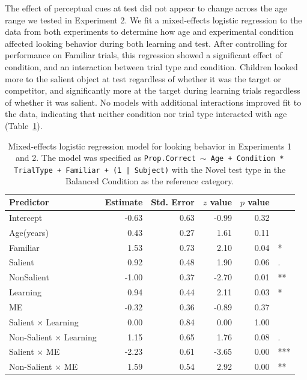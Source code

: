 \documentclass[man,floatsintext]{apa6}
\begin{document}
The effect of perceptual cues at test did not appear to change across the age range we tested in Experiment 2. We fit a mixed-effects logistic regression to the data from both experiments to determine how age and experimental condition affected looking behavior during both learning and test. After controlling for performance on Familiar trials, this regression showed a significant effect of condition, and an interaction between trial type and condition. Children looked more to the salient object at test regardless of whether it was the target or competitor, and significantly more at the target during learning trials regardless of whether it was salient. No models with additional interactions improved fit to the data, indicating that neither condition nor trial type interacted with age (Table~\ref{tab:model_table}). 

\begin{table}[tb]
\centering
\begin{tabular}{lrrrrl}
 Predictor & Estimate & Std. Error & $z$ value & $p$ value &  \\ 
  \hline
Intercept & -0.63 & 0.63 & -0.99 & 0.32 &  \\ 
  Age(years) & 0.43 & 0.27 & 1.61 & 0.11 &  \\ 
  Familiar & 1.53 & 0.73 & 2.10 & 0.04 & * \\ 
  Salient & 0.92 & 0.48 & 1.90 & 0.06 & . \\ 
  NonSalient & -1.00 & 0.37 & -2.70 & 0.01 & ** \\ 
  Learning & 0.94 & 0.44 & 2.11 & 0.03 & * \\ 
  ME & -0.32 & 0.36 & -0.89 & 0.37 &  \\ 
  Salient $\times$ Learning & 0.00 & 0.84 & 0.00 & 1.00 &  \\ 
  Non-Salient $\times$ Learning & 1.15 & 0.65 & 1.76 & 0.08 & . \\ 
  Salient $\times$ ME & -2.23 & 0.61 & -3.65 & 0.00 & *** \\ 
  Non-Salient $\times$ ME & 1.59 & 0.54 & 2.92 & 0.00 & ** \\ 
   \hline
\end{tabular}
\vspace{6pt}
\caption{\label{tab:model_table} Mixed-effects logistic regression model for looking behavior in Experiments 1 and 2. The model was specified as \small{\tt{Prop.Correct $\sim$ Age + Condition * TrialType + Familiar + (1 | Subject)}} with the Novel test type in the Balanced Condition as the reference category.}
\end{table}
\end{document}
